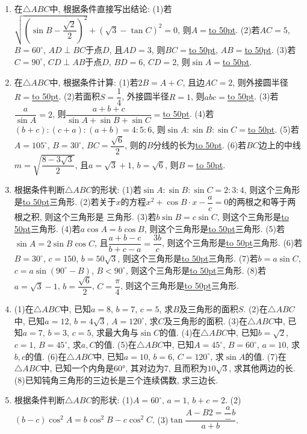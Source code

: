 \documentclass[10pt,a4paper]{article}
\newcommand{\blank}[1]{\underline{\hbox to #1pt{}}}
\begin{document}
\begin{enumerate}[1.]
(3)若$A=45^\circ$, $B=60^{\circ }$, $a=10$, 则$b=$\blank{50}, $c=$\blank{50}.
(4)若$\cos A=\dfrac{\sin B}{2\sin C}$, $b=4\sqrt 3$, $2\sin B=\sqrt 3$, 则$a=$\blank{50}.
\item 在$\triangle ABC$中, 根据条件直接写出结论:
(1)若$\sqrt {(\sin B-\dfrac{\sqrt 2}2)^2}+(\sqrt 3-\tan C)^2=0$, 则$A=$\blank{50}.
(2)若$AC=5$, $B=60^{\circ }$, $AD\perp BC$于点$D$, 且$AD=3$, 则$BC=$\blank{50}, $AB=$\blank{50}.
(3)若$C=90^{\circ }$, $CD\perp AB$于点$D$, $BD=6$, $CD=2$, 则$\sin A=$\blank{50}.
\item 在$\triangle ABC$中, 根据条件计算:
(1)若$2B=A+C$, 且边$AC=2$, 则外接圆半径$R=$\blank{50}.
(2)若面积$S=\dfrac 14$, 外接圆半径$R=1$, 则$abc=$\blank{50}.
(3)若$\dfrac a{\sin A}=2$, 则$\dfrac{a+b+c}{\sin A+\sin B+\sin C}=$\blank{50}.
(4)若$(b+c):(c+a):(a+b)=4:5:6$, 则$\sin A:\sin B:\sin C=$\blank{50}.
(5)若$A=105^\circ$, $B=30^\circ$, $BC=\dfrac{\sqrt 6}2$, 则的$B$分线的长为\blank{50}.
(6)若$BC$边上的中线$m=\sqrt {\dfrac{8-3\sqrt 3}2}$, 且$a=\sqrt 3+1$, $b=\sqrt 6$, 则$B=$\blank{50}.
\item 根据条件判断$\triangle ABC$的形状:
(1)若$\sin A:\sin B:\sin C=2:3:4$, 则这个三角形是\blank{50}三角形.
(2)若关于$x$的方程$x^2+\cos B\cdot x-\dfrac ac=0$的两根之和等于两根之积, 则这个三角形是   三角形.
(3)若$b\sin B=c\sin C$, 则这个三角形是\blank{50}三角形.
(4)若$a\cos A=b\cos B$, 则这个三角形是\blank{50}三角形.
(5)若$\sin A=2\sin B\cos C$, 且$\dfrac{a+b-c}{b+c-a}=\dfrac{3b}c$, 则这个三角形是\blank{50}三角形.
(6)若$B=30^\circ$, $c=150$, $b=50\sqrt 3$, 则这个三角形是\blank{50}三角形.
(7)若$b=a\sin C$, $c=a\sin (90^\circ -B)$, $B<90^\circ$, 则这个三角形是\blank{50}三角形.
(8)若$a=\sqrt 3-1$, $b=\dfrac{\sqrt 6}2$, $C=\dfrac{\pi }4$, 则这个三角形是\blank{50}三角形.
\item (1)在$\triangle ABC$中, 已知$a=8$, $b=7$, $c=5$, 求$B$及三角形的面积$S$.
(2)在$\triangle ABC$中, 已知$a=12$, $b=4\sqrt 3$, $A=120^\circ$, 求$C$及三角形的面积.
(3)在$\triangle ABC$中, 已知$a=7$, $b=3$, $c=5$, 求最大角与$\sin C$的值.
(4)在$\triangle ABC$中, 已知$b=\sqrt 2$, $c=1$, $B=45^\circ$, 求$a,C$的值.
(5)在$\triangle ABC$中, 已知$A=45^\circ$, $B=60^\circ$, $a=10$, 求$b,c$的值.
(6)在$\triangle ABC$中, 已知$a=10$, $b=6$, $C=120^\circ$, 求$\sin A$的值.
(7)在$\triangle ABC$中, 已知一个内角是60°, 其对边为7, 且而积为$10\sqrt 3$, 求其他两边的长.
(8)已知钝角三角形的三边长是三个连续偶数, 求三边长.
\item 根据条件判断$\triangle ABC$的形状:
(1)$A=60^{\circ }$, $a=1$, $b+c=2$.			(2)$(b-c)\cos ^2A=b\cos ^2B-c\cos ^2C$.
(3)$\tan \dfrac{A-B2=\dfrac a-b}{a+b}$.

\end{enumerate}
\end{document}
